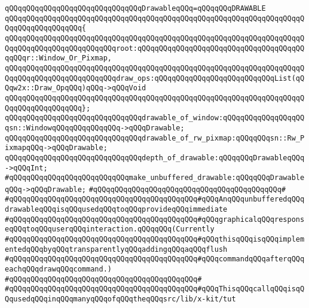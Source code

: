 \newline
\verb|qQQqqQQqqQQqqQQqqQQqqQQqqQQqqQQqDrawableqQQq=qQQqqQQqDRAWABLE|\newline
\verb|qQQqqQQqqQQqqQQqqQQqqQQqqQQqqQQqqQQqqQQqqQQqqQQqqQQqqQQqqQQqqQQqqQQqqQQqqQQqqQQqqQQqqQQq{|\newline
\verb|qQQqqQQqqQQqqQQqqQQqqQQqqQQqqQQqqQQqqQQqqQQqqQQqqQQqqQQqqQQqqQQqqQQqqQQqqQQqqQQqqQQqqQQqqQQqqQQqroot:qQQqqQQqqQQqqQQqqQQqqQQqqQQqqQQqqQQqqQQqqQQqr::Window_Or_Pixmap,|\newline
\verb|qQQqqQQqqQQqqQQqqQQqqQQqqQQqqQQqqQQqqQQqqQQqqQQqqQQqqQQqqQQqqQQqqQQqqQQqqQQqqQQqqQQqqQQqqQQqqQQqdraw_ops:qQQqqQQqqQQqqQQqqQQqqQQqqQQqList(qQQqw2x::Draw_OpqQQq)qQQq->qQQqVoid|\newline
\verb|qQQqqQQqqQQqqQQqqQQqqQQqqQQqqQQqqQQqqQQqqQQqqQQqqQQqqQQqqQQqqQQqqQQqqQQqqQQqqQQqqQQqqQQq};|\newline
\newline
\verb|qQQqqQQqqQQqqQQqqQQqqQQqqQQqqQQqdrawable_of_window:qQQqqQQqqQQqqQQqqQQqsn::WindowqQQqqQQqqQQqqQQq->qQQqDrawable;|\newline
\verb|qQQqqQQqqQQqqQQqqQQqqQQqqQQqqQQqdrawable_of_rw_pixmap:qQQqqQQqsn::Rw_PixmapqQQq->qQQqDrawable;|\newline
\newline
\verb|qQQqqQQqqQQqqQQqqQQqqQQqqQQqqQQqdepth_of_drawable:qQQqqQQqDrawableqQQq->qQQqInt;|\newline
\newline
\verb|#qQQqqQQqqQQqqQQqqQQqqQQqqQQqmake_unbuffered_drawable:qQQqqQQqDrawableqQQq->qQQqDrawable;|\newline
\verb|#qQQqqQQqqQQqqQQqqQQqqQQqqQQqqQQqqQQqqQQqqQQq#|\newline
\verb|#qQQqqQQqqQQqqQQqqQQqqQQqqQQqqQQqqQQqqQQqqQQq#qQQqAnqQQqunbufferedqQQqdrawableqQQqisqQQqusedqQQqtoqQQqprovideqQQqimmediate|\newline
\verb|#qQQqqQQqqQQqqQQqqQQqqQQqqQQqqQQqqQQqqQQqqQQq#qQQqgraphicalqQQqresponseqQQqtoqQQquserqQQqinteraction.qQQqqQQq(Currently|\newline
\verb|#qQQqqQQqqQQqqQQqqQQqqQQqqQQqqQQqqQQqqQQqqQQq#qQQqthisqQQqisqQQqimplementedqQQqbyqQQqtransparentlyqQQqaddingqQQqaqQQqflush|\newline
\verb|#qQQqqQQqqQQqqQQqqQQqqQQqqQQqqQQqqQQqqQQqqQQq#qQQqcommandqQQqafterqQQqeachqQQqdrawqQQqcommand.)|\newline
\verb|#qQQqqQQqqQQqqQQqqQQqqQQqqQQqqQQqqQQqqQQqqQQq#|\newline
\verb|#qQQqqQQqqQQqqQQqqQQqqQQqqQQqqQQqqQQqqQQqqQQq#qQQqThisqQQqcallqQQqisqQQqusedqQQqinqQQqmanyqQQqofqQQqtheqQQqsrc/lib/x-kit/tut|\newline
